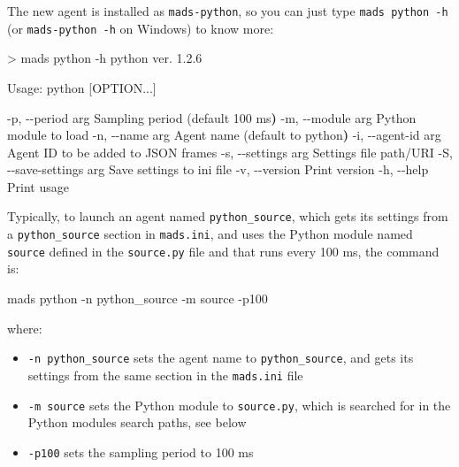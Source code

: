 \documentclass[
  letterpaper,
  DIV=11,
  numbers=noendperiod]{scrartcl}
\newenvironment{Shaded}{\begin{snugshade}}{\end{snugshade}}
\newcommand{\AttributeTok}[1]{\textcolor[rgb]{0.40,0.45,0.13}{#1}}
\newcommand{\ErrorTok}[1]{\textcolor[rgb]{0.68,0.00,0.00}{#1}}
\newcommand{\ExtensionTok}[1]{\textcolor[rgb]{0.00,0.23,0.31}{#1}}
\newcommand{\KeywordTok}[1]{\textcolor[rgb]{0.00,0.23,0.31}{\textbf{#1}}}
\newcommand{\NormalTok}[1]{\textcolor[rgb]{0.00,0.23,0.31}{#1}}
\newcommand{\OperatorTok}[1]{\textcolor[rgb]{0.37,0.37,0.37}{#1}}
\newcommand{\PreprocessorTok}[1]{\textcolor[rgb]{0.68,0.00,0.00}{#1}}
\newcommand{\SpecialStringTok}[1]{\textcolor[rgb]{0.13,0.47,0.30}{#1}}
\newcommand{\StringTok}[1]{\textcolor[rgb]{0.13,0.47,0.30}{#1}}
\providecommand{\tightlist}{%
  \setlength{\itemsep}{0pt}\setlength{\parskip}{0pt}}\usepackage{longtable,booktabs,array}
\begin{document}
The new agent is installed as \texttt{mads-python}, so you can just type
\texttt{mads\ python\ -h} (or \texttt{mads-python\ -h} on Windows) to
know more:

\begin{Shaded}
\begin{Highlighting}[]
\OperatorTok{\textgreater{}}\NormalTok{ mads }\ExtensionTok{python} \AttributeTok{{-}h}
\ExtensionTok{python}\NormalTok{ ver. 1.2.6}

\ExtensionTok{Usage:}
  \ExtensionTok{python} \PreprocessorTok{[}\SpecialStringTok{OPTION...}\PreprocessorTok{]}

  \ExtensionTok{{-}p,} \AttributeTok{{-}{-}period}\NormalTok{ arg         Sampling period }\ErrorTok{(}\ExtensionTok{default}\NormalTok{ 100 ms}\KeywordTok{)}
  \ExtensionTok{{-}m,} \AttributeTok{{-}{-}module}\NormalTok{ arg         Python module to load}
  \ExtensionTok{{-}n,} \AttributeTok{{-}{-}name}\NormalTok{ arg           Agent name }\ErrorTok{(}\ExtensionTok{default}\NormalTok{ to }\StringTok{\textquotesingle{}python\textquotesingle{}}\KeywordTok{)}
  \ExtensionTok{{-}i,} \AttributeTok{{-}{-}agent{-}id}\NormalTok{ arg       Agent ID to be added to JSON frames}
  \ExtensionTok{{-}s,} \AttributeTok{{-}{-}settings}\NormalTok{ arg       Settings file path/URI}
  \ExtensionTok{{-}S,} \AttributeTok{{-}{-}save{-}settings}\NormalTok{ arg  Save settings to ini file}
  \ExtensionTok{{-}v,} \AttributeTok{{-}{-}version}\NormalTok{            Print version}
  \ExtensionTok{{-}h,} \AttributeTok{{-}{-}help}\NormalTok{               Print usage}
\end{Highlighting}
\end{Shaded}

Typically, to launch an agent named \texttt{python\_source}, which gets
its settings from a \texttt{python\_source} section in
\texttt{mads.ini}, and uses the Python module named \texttt{source}
defined in the \texttt{source.py} file and that runs every 100 ms, the
command is:

\begin{Shaded}
\begin{Highlighting}[]
\ExtensionTok{mads}\NormalTok{ python }\AttributeTok{{-}n}\NormalTok{ python\_source }\AttributeTok{{-}m}\NormalTok{ source }\AttributeTok{{-}p100}
\end{Highlighting}
\end{Shaded}

where:

\begin{itemize}
\tightlist
\item
  \texttt{-n\ python\_source} sets the agent name to
  \texttt{python\_source}, and gets its settings from the same section
  in the \texttt{mads.ini} file
\item
  \texttt{-m\ source} sets the Python module to \texttt{source.py},
  which is searched for in the Python modules search paths, see below
\item
  \texttt{-p100} sets the sampling period to 100 ms
\end{itemize}
\end{document}
